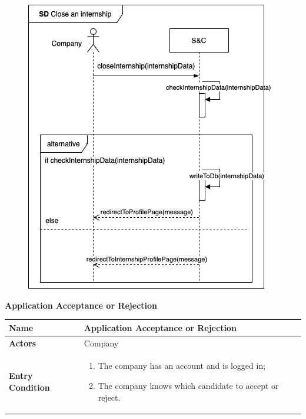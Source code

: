 \begin{enumerate}[label=\textbf{[US\arabic*]}, left = 0pt, align = left, resume]
            \newpage     %
            \begin{figure}[h!]
                \centering        \includegraphics{RASD/Images/UseCases/CloseInternship.drawio.png}
                \label{fig:example}
            \end{figure}

            \newpage
            \item \textbf{Application Acceptance or Rejection}
            
            \begin{longtable}{|l|p{11cm}|}  
                \hline
                \textbf{Name} & 
                    \textbf{Application Acceptance or Rejection} \\
                \hline
                
                \textbf{Actors} & 
                    Company \\
                \hline
                
                \textbf{Entry Condition} & 
                    \begin{enumerate}[label=\textbullet, itemsep=0em]
                        \item The company has an account and is logged in;
                        \item The company knows which candidate to accept or reject. 
                    \end{enumerate} \\
                \hline
                

\end{longtable}
\end{enumerate}
